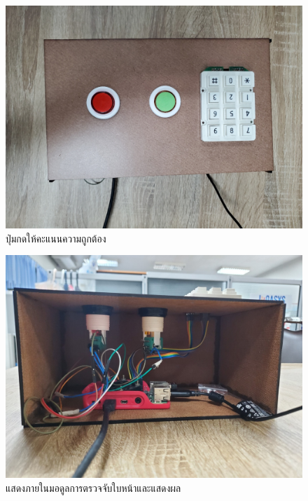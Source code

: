 \begin{figure}[!ht]
  \begin{center}
    \includegraphics[scale=.2]{pic/rpi_top.jpg}
    \caption[button]{ปุ่มกดให้คะแนนความถูกต้อง}
    \label{fig:button_module}
  \end{center}
\end{figure}

\begin{figure}[!ht]
  \begin{center}
    \includegraphics[scale=.2]{pic/rpi_back.jpg}
    \caption[inside module]{แสดงภายในมอดูลการตรวจจับใบหน้าและแสดงผล}
    \label{fig:inside_module}
  \end{center}
\end{figure}

